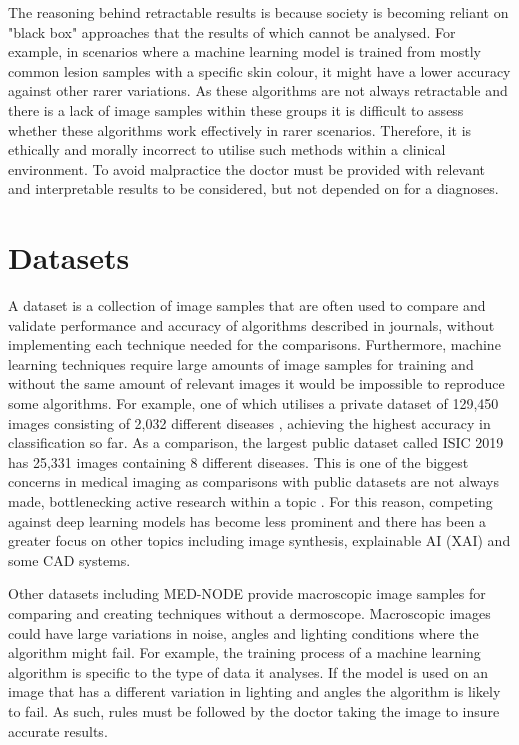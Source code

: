 The reasoning behind retractable results is because society is becoming reliant on "black box" approaches that the results of which cannot be analysed. For example, in scenarios where a machine learning model is trained from mostly common lesion samples with a specific skin colour, it might have a lower accuracy against other rarer variations. As these algorithms are not always retractable and there is a lack of image samples within these groups it is difficult to assess whether these algorithms work effectively in rarer scenarios. Therefore, it is ethically and morally incorrect to utilise such methods within a clinical environment. To avoid malpractice the doctor must be provided with relevant and interpretable results to be considered, but not depended on for a diagnoses.

\section{Datasets}
A dataset is a collection of image samples that are often used to compare and validate performance and accuracy of algorithms described in journals, without implementing each technique needed for the comparisons.  Furthermore, machine learning techniques require large amounts of image samples for training and without the same amount of relevant images it would be impossible to reproduce some algorithms. For example, one of which utilises a private dataset of 129,450 images consisting of 2,032 different diseases \cite{Andre2017}, achieving the highest accuracy in classification so far. As a comparison, the largest public dataset called ISIC 2019 has 25,331 images containing 8 different diseases. This is one of the biggest concerns in medical imaging as comparisons with public datasets are not always made, bottlenecking active research within a topic \cite{Roh2019}. For this reason, competing against deep learning models has become less prominent and there has been a greater focus on other topics including image synthesis, explainable AI (XAI) and some CAD systems.

Other datasets including MED-NODE \cite{Argenziano2001} provide macroscopic image samples for comparing and creating techniques without a dermoscope. Macroscopic images could have large variations in noise, angles and lighting conditions where the algorithm might fail. For example, the training process of a machine learning algorithm is specific to the type of data it analyses. If the model is used on an image that has a different variation in lighting and angles the algorithm is likely to fail. As such, rules must be followed by the doctor taking the image to insure accurate results.

